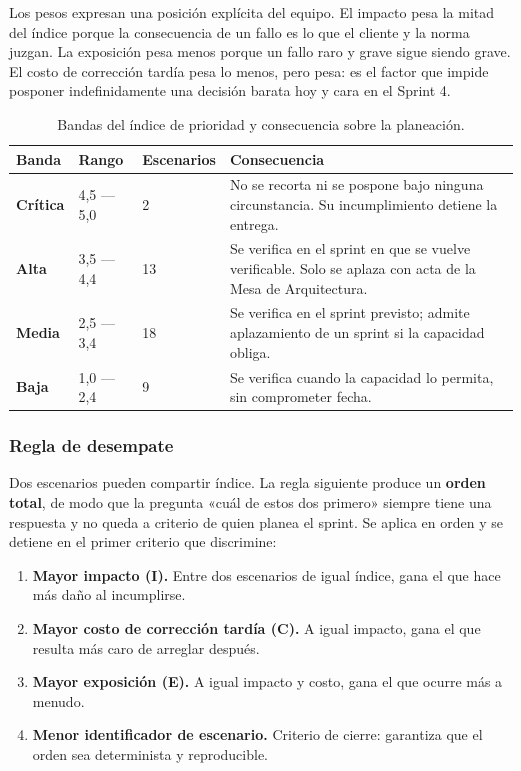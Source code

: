\documentclass[11pt,a4paper]{article}
\newcommand{\bcritica}{\textcolor{vinotinto}{\textbf{Crítica}}}
\newcommand{\balta}{\textcolor{vinoclaro}{\textbf{Alta}}}
\newcommand{\bmedia}{\textcolor{ringProbar}{\textbf{Media}}}
\newcommand{\bbaja}{\textcolor{ringEvitar}{\textbf{Baja}}}
\begin{document}
Los pesos expresan una posición explícita del equipo. El impacto pesa la mitad del índice porque la consecuencia de un fallo es lo que el cliente y la norma juzgan. La exposición pesa menos porque un fallo raro y grave sigue siendo grave. El costo de corrección tardía pesa lo menos, pero pesa: es el factor que impide posponer indefinidamente una decisión barata hoy y cara en el Sprint 4.

\begin{longtable}{L{2.4cm} L{2.4cm} L{2.0cm} L{7.4cm}}
\caption{Bandas del índice de prioridad y consecuencia sobre la planeación.}\label{tab:bandas}\\
\toprule
\textbf{Banda} & \textbf{Rango} & \textbf{Escenarios} & \textbf{Consecuencia} \\
\midrule
\endhead
\bottomrule
\endlastfoot
\bcritica{} & 4,5 --- 5,0 & 2 & No se recorta ni se pospone bajo ninguna circunstancia. Su incumplimiento detiene la entrega. \\
\balta{} & 3,5 --- 4,4 & 13 & Se verifica en el sprint en que se vuelve verificable. Solo se aplaza con acta de la Mesa de Arquitectura. \\
\bmedia{} & 2,5 --- 3,4 & 18 & Se verifica en el sprint previsto; admite aplazamiento de un sprint si la capacidad obliga. \\
\bbaja{} & 1,0 --- 2,4 & 9 & Se verifica cuando la capacidad lo permita, sin comprometer fecha. \\
\end{longtable}

\subsubsection*{Regla de desempate}

Dos escenarios pueden compartir índice. La regla siguiente produce un \textbf{orden total}, de modo que la pregunta «cuál de estos dos primero» siempre tiene una respuesta y no queda a criterio de quien planea el sprint. Se aplica en orden y se detiene en el primer criterio que discrimine:

\begin{enumerate}
\item \textbf{Mayor impacto (I).} Entre dos escenarios de igual índice, gana el que hace más daño al incumplirse.
\item \textbf{Mayor costo de corrección tardía (C).} A igual impacto, gana el que resulta más caro de arreglar después.
\item \textbf{Mayor exposición (E).} A igual impacto y costo, gana el que ocurre más a menudo.
\item \textbf{Menor identificador de escenario.} Criterio de cierre: garantiza que el orden sea determinista y reproducible.
\end{enumerate}
\end{document}
